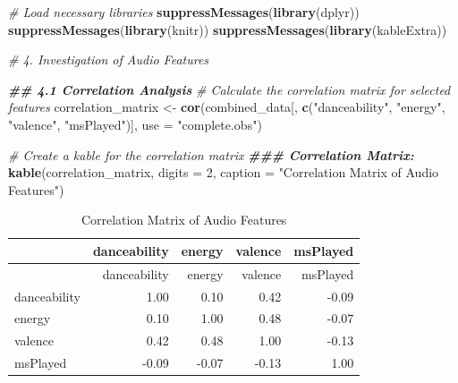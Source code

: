 \documentclass[
]{article}
\newenvironment{Shaded}{\begin{snugshade}}{\end{snugshade}}
\newcommand{\AttributeTok}[1]{\textcolor[rgb]{0.13,0.29,0.53}{#1}}
\newcommand{\CommentTok}[1]{\textcolor[rgb]{0.56,0.35,0.01}{\textit{#1}}}
\newcommand{\DecValTok}[1]{\textcolor[rgb]{0.00,0.00,0.81}{#1}}
\newcommand{\DocumentationTok}[1]{\textcolor[rgb]{0.56,0.35,0.01}{\textbf{\textit{#1}}}}
\newcommand{\FunctionTok}[1]{\textcolor[rgb]{0.13,0.29,0.53}{\textbf{#1}}}
\newcommand{\NormalTok}[1]{#1}
\newcommand{\OtherTok}[1]{\textcolor[rgb]{0.56,0.35,0.01}{#1}}
\newcommand{\StringTok}[1]{\textcolor[rgb]{0.31,0.60,0.02}{#1}}
\begin{document}
\begin{Shaded}
\begin{Highlighting}[]
\CommentTok{\# Load necessary libraries}
\FunctionTok{suppressMessages}\NormalTok{(}\FunctionTok{library}\NormalTok{(dplyr))}
\FunctionTok{suppressMessages}\NormalTok{(}\FunctionTok{library}\NormalTok{(knitr))}
\FunctionTok{suppressMessages}\NormalTok{(}\FunctionTok{library}\NormalTok{(kableExtra))}

\CommentTok{\# 4. Investigation of Audio Features}

\DocumentationTok{\#\# 4.1 Correlation Analysis}
\CommentTok{\# Calculate the correlation matrix for selected features}
\NormalTok{correlation\_matrix }\OtherTok{\textless{}{-}} \FunctionTok{cor}\NormalTok{(combined\_data[, }\FunctionTok{c}\NormalTok{(}\StringTok{"danceability"}\NormalTok{, }\StringTok{"energy"}\NormalTok{, }\StringTok{"valence"}\NormalTok{, }\StringTok{"msPlayed"}\NormalTok{)], }\AttributeTok{use =} \StringTok{"complete.obs"}\NormalTok{)}

\CommentTok{\# Create a kable for the correlation matrix}
\DocumentationTok{\#\#\# Correlation Matrix:}
\FunctionTok{kable}\NormalTok{(correlation\_matrix, }\AttributeTok{digits =} \DecValTok{2}\NormalTok{, }\AttributeTok{caption =} \StringTok{"Correlation Matrix of Audio Features"}\NormalTok{)}
\end{Highlighting}
\end{Shaded}

\begin{longtable}[]{@{}lrrrr@{}}
\caption{Correlation Matrix of Audio Features}\tabularnewline
\toprule\noalign{}
& danceability & energy & valence & msPlayed \\
\midrule\noalign{}
\endfirsthead
\toprule\noalign{}
& danceability & energy & valence & msPlayed \\
\midrule\noalign{}
\endhead
\bottomrule\noalign{}
\endlastfoot
danceability & 1.00 & 0.10 & 0.42 & -0.09 \\
energy & 0.10 & 1.00 & 0.48 & -0.07 \\
valence & 0.42 & 0.48 & 1.00 & -0.13 \\
msPlayed & -0.09 & -0.07 & -0.13 & 1.00 \\
\end{longtable}
\end{document}
